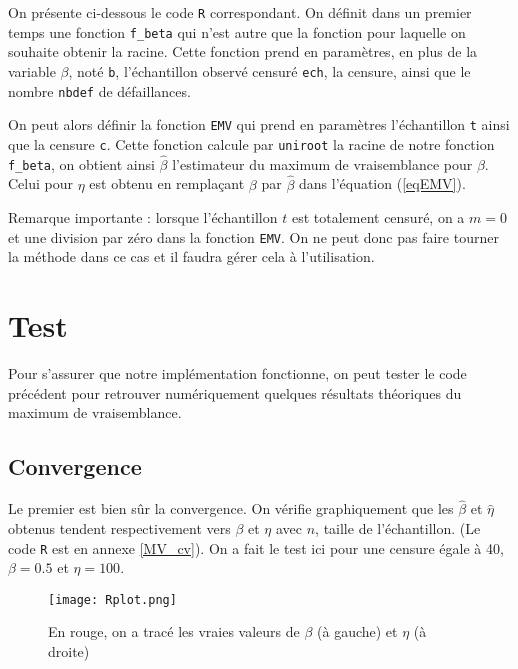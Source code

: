 \documentclass[a4paper]{report}
\begin{document}
On présente ci-dessous le code \verb|R| correspondant. On définit dans un premier temps une fonction \verb|f_beta| qui n'est autre que la fonction pour laquelle on souhaite obtenir la racine. Cette fonction prend en paramètres, en plus de la variable $\beta$, noté \verb|b|, l'échantillon observé censuré \verb|ech|, la censure, ainsi que le nombre \verb|nbdef| de défaillances.

 On peut alors définir la fonction \verb|EMV| qui prend en paramètres l'échantillon \verb|t| ainsi que la censure \verb|c|. Cette fonction calcule par \verb|uniroot| la racine de notre fonction \verb|f_beta|, on obtient ainsi $\hat{\beta}$ l'estimateur du maximum de vraisemblance pour $\beta$. Celui pour $\eta$ est obtenu en remplaçant $\beta$ par $\hat{\beta}$ dans l'équation (\ref{eqEMV}). 



 Remarque importante : lorsque l'échantillon $t$ est totalement censuré, on a $m=0$ et une division par zéro dans la fonction \verb|EMV|. On ne peut donc pas faire tourner la méthode dans ce cas et il faudra gérer cela à l'utilisation.
     
\section{Test}

Pour s'assurer que notre implémentation fonctionne, on peut tester le code précédent pour retrouver numériquement quelques résultats théoriques du maximum de vraisemblance.     
    
\subsection{Convergence}

Le premier est bien sûr la convergence. On vérifie graphiquement que les $\hat{\beta}$ et $\hat{\eta}$ obtenus tendent respectivement vers $\beta$ et $\eta$ avec $n$, taille de l'échantillon. (Le code \verb|R| est en annexe \ref{MV_cv}). On a fait le test ici pour une censure égale à 40, $\beta = 0.5$ et $\eta=100$.

 \begin{figure}[!ht]
	\centering
     	\texttt{[image: Rplot.png]}

	\caption{En rouge, on a tracé les vraies valeurs de $\beta$ (à gauche) et $\eta$ (à droite)}
\end{figure}
\end{document}
